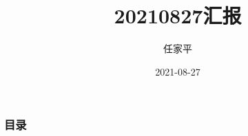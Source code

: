 \documentclass[12pt, utf-8]{beamer}
\title{20210827汇报}
\author{任家平}
\institute{同济大学测绘与地理信息学院}
\date{2021-08-27}
\begin{document}
\begin{frame}
    \titlepage
\end{frame}

\begin{frame}
    \frametitle{目录}
    \tableofcontents
\end{frame}




\end{document}
